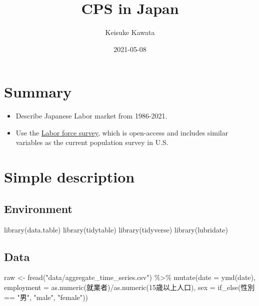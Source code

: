 \documentclass[
]{book}
\title{CPS in Japan}
\author{Keisuke Kawata}
\date{2021-05-08}
\newenvironment{Shaded}{\begin{snugshade}}{\end{snugshade}}
\newcommand{\AttributeTok}[1]{\textcolor[rgb]{0.77,0.63,0.00}{#1}}
\newcommand{\FunctionTok}[1]{\textcolor[rgb]{0.00,0.00,0.00}{#1}}
\newcommand{\NormalTok}[1]{#1}
\newcommand{\OtherTok}[1]{\textcolor[rgb]{0.56,0.35,0.01}{#1}}
\newcommand{\SpecialCharTok}[1]{\textcolor[rgb]{0.00,0.00,0.00}{#1}}
\newcommand{\StringTok}[1]{\textcolor[rgb]{0.31,0.60,0.02}{#1}}
\begin{document}
\maketitle

{
\setcounter{tocdepth}{1}
\tableofcontents
}
\hypertarget{summary}{%
\chapter{Summary}\label{summary}}

\begin{itemize}
\item
  Describe Japanese Labor market from 1986-2021.
\item
  Use the \href{https://www.stat.go.jp/english/data/roudou/index.html}{Labor force survey}, which is open-access and includes similar variables as the current population survey in U.S.
\end{itemize}

\hypertarget{simple-description}{%
\chapter{Simple description}\label{simple-description}}

\hypertarget{environment}{%
\section{Environment}\label{environment}}

\begin{Shaded}
\begin{Highlighting}[]
\FunctionTok{library}\NormalTok{(data.table)}
\FunctionTok{library}\NormalTok{(tidytable)}
\FunctionTok{library}\NormalTok{(tidyverse)}
\FunctionTok{library}\NormalTok{(lubridate)}
\end{Highlighting}
\end{Shaded}

\hypertarget{data}{%
\section{Data}\label{data}}

\begin{Shaded}
\begin{Highlighting}[]
\NormalTok{raw }\OtherTok{\textless{}{-}} 
  \FunctionTok{fread}\NormalTok{(}\StringTok{"data/aggregate\_time\_series.csv"}\NormalTok{) }\SpecialCharTok{\%\textgreater{}\%}
  \FunctionTok{mutate}\NormalTok{(}\AttributeTok{date =} \FunctionTok{ymd}\NormalTok{(date),}
         \AttributeTok{employment =} \FunctionTok{as.numeric}\NormalTok{(就業者)}\SpecialCharTok{/}\FunctionTok{as.numeric}\NormalTok{(}\StringTok{\textasciigrave{}}\AttributeTok{15歳以上人口}\StringTok{\textasciigrave{}}\NormalTok{),}
         \AttributeTok{sex =} \FunctionTok{if\_else}\NormalTok{(性別 }\SpecialCharTok{==} \StringTok{"男"}\NormalTok{, }\StringTok{"male"}\NormalTok{, }\StringTok{"female"}\NormalTok{))}
\end{Highlighting}
\end{Shaded}
\end{document}
